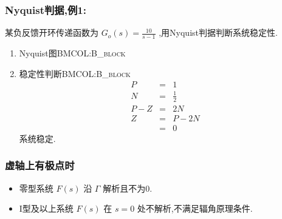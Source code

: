 \documentclass[table]{article}
\begin{document}
\subsubsection{Nyquist判据,例1:}
\label{sec:orge444cab}
某负反馈开环传递函数为 \(G_o(s)=\frac{10}{s-1}\) ,用Nyquist判据判断系统稳定性.

\begin{enumerate}
\item Nyquist图\hfill{}\textsc{BMCOL:B\_block}
\label{sec:org0eab839}

\item 稳定性判断\hfill{}\textsc{BMCOL:B\_block}
\label{sec:org4f01930}
\begin{eqnarray*}
P & = & 1\\
N &=& \frac{1}{2} \\
P-Z &=& 2N \\
Z &=& P-2N \\
  &=&0 
\end{eqnarray*}
系统稳定.
\end{enumerate}

\subsubsection{虚轴上有极点时}
\label{sec:orgb51dbcc}
\begin{itemize}
\item 零型系统 \(F(s)\) 沿 \(\Gamma\) 解析且不为0.
\item I型及以上系统 \(F(s)\) 在 \(s=0\) 处不解析,不满足辐角原理条件.
\end{itemize}
\end{document}
